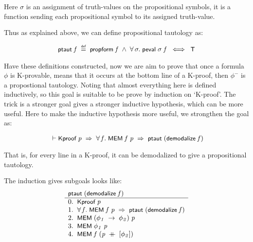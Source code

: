 \documentclass[letterpaper]{article}
\renewcommand{\HOLConst}[1]{{\textsf{\upshape\small #1}}}
\renewcommand{\HOLinline}[1]{\ensuremath{#1}}
\newenvironment{holmath}{\begin{displaymath}\begin{array}{l}}{\end{array}\end{displaymath}\ignorespacesafterend}
\begin{document}
Here $\sigma$ is an assignment of truth-values on the propositional symbols, it is a function sending each propositional symbol to its assigned truth-value.

Thus as explained above, we can define propositional tautology as:

\begin{holmath}
  \HOLConst{ptaut}\;\HOLFreeVar{f}\;\HOLSymConst{\HOLTokenDefEquality{}}\;\HOLConst{propform}\;\HOLFreeVar{f}\;\HOLSymConst{\HOLTokenConj{}}\;\HOLSymConst{\HOLTokenForall{}}\HOLBoundVar{\ensuremath{\sigma}}.\;\HOLConst{peval}\;\HOLBoundVar{\ensuremath{\sigma}}\;\HOLFreeVar{f}\;\HOLSymConst{\HOLTokenEquiv{}}\;\HOLConst{T}
\end{holmath}

Have these definitions constructed, now we are aim to prove that once a formula $\phi$ is K-provable, means that it occurs at the bottom line of a K-proof, then $\phi^-$ is a propostional tautology. Noting that almost everything here is defined inductively, so this goal is suitable to be prove by induction on `K-proof'. The trick is a stronger goal gives a stronger inductive hypothesis, which can be more useful. Here to make the inductive hypothesis more useful, we strongthen the goal as:

\begin{holmath}
  \ensuremath{\HOLTokenTurnstile}\HOLConst{Kproof}\;\HOLFreeVar{p}\;\HOLSymConst{\HOLTokenImp{}}\;\HOLSymConst{\HOLTokenForall{}}\HOLBoundVar{f}.\;\HOLConst{MEM}\;\HOLBoundVar{f}\;\HOLFreeVar{p}\;\HOLSymConst{\HOLTokenImp{}}\;\HOLConst{ptaut}\;(\HOLConst{demodalize}\;\HOLBoundVar{f})
\end{holmath}

That is, for every line in a K-proof, it can be demodalized to give a propositional tautology.

The induction gives subgoals looks like:
\[
\begin{array}{l}
\HOLinline{\HOLConst{ptaut}\;(\HOLConst{demodalize}\;\HOLFreeVar{f})}\\ \hline
0. \;\;\HOLinline{\HOLConst{Kproof}\;\HOLFreeVar{p}}\\
1. \;\;\HOLinline{\HOLSymConst{\HOLTokenForall{}}\HOLBoundVar{f}.\;\HOLConst{MEM}\;\HOLBoundVar{f}\;\HOLFreeVar{p}\;\HOLSymConst{\HOLTokenImp{}}\;\HOLConst{ptaut}\;(\HOLConst{demodalize}\;\HOLBoundVar{f})}\\
2. \;\;\HOLinline{\HOLConst{MEM}\;(\HOLFreeVar{\ensuremath{\phi\sb{1}}}\;\HOLSymConst{\ensuremath{\rightarrow}}\;\HOLFreeVar{\ensuremath{\phi\sb{2}}})\;\HOLFreeVar{p}}\\
3. \;\;\HOLinline{\HOLConst{MEM}\;\HOLFreeVar{\ensuremath{\phi\sb{1}}}\;\HOLFreeVar{p}}\\
4. \;\;\HOLinline{\HOLConst{MEM}\;\HOLFreeVar{f}\;(\HOLFreeVar{p}\;\HOLSymConst{\HOLTokenDoublePlus}\;[\HOLFreeVar{\ensuremath{\phi\sb{2}}}])}
\end{array}
\]
\end{document}
